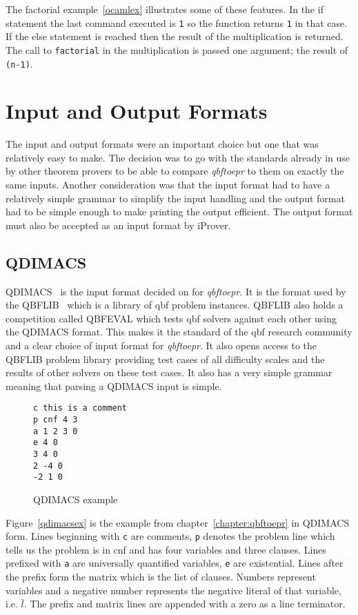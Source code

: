 The factorial example~\ref{ocamlex} illustrates some of these features. In the if statement the last command executed is \texttt{1} so the function returns \texttt{1} in that case. If the else statement is reached then the result of the multiplication is returned. The call to \texttt{factorial} in the multiplication is passed one argument; the result of \texttt{(n-1)}.

\section{Input and Output Formats}
The input and output formats were an important choice but one that was relatively easy to make. The decision was to go with the standards already in use by other theorem provers to be able to compare \textit{qbftoepr} to them on exactly the same inputs. Another consideration was that the input format had to have a relatively simple grammar to simplify the input handling and the output format had to be simple enough to make printing the output efficient. The output format must also be accepted as an input format by iProver.

\subsection{QDIMACS}
QDIMACS~\cite{qdimacs} is the input format decided on for \textit{qbftoepr}. It is the format used by the QBFLIB~\cite{qbflib} which is a library of \gls{qbf} problem instances. QBFLIB also holds a competition called QBFEVAL which tests \gls{qbf} solvers against each other using the QDIMACS format. This makes it the standard of the \gls{qbf} research community and a clear choice of input format for \textit{qbftoepr}. It also opens access to the QBFLIB problem library providing test cases of all difficulty scales and the results of other solvers on these test cases. It also has a very simple grammar meaning that parsing a QDIMACS input is simple.

\begin{figure}
\caption{QDIMACS example}
\begin{CenteredBox}
\begin{lstlisting}[label=qdimacsex]
c this is a comment
p cnf 4 3
a 1 2 3 0
e 4 0
3 4 0
2 -4 0
-2 1 0
\end{lstlisting}
\end{CenteredBox}
\end{figure}
Figure~\ref{qdimacsex} is the example from chapter~\ref{chapter:qbftoepr} in QDIMACS form. Lines beginning with \texttt{c} are comments, \texttt{p} denotes the problem line which tells us the problem is in \gls{cnf} and has four variables and three clauses. Lines prefixed with \texttt{a} are universally quantified variables, \texttt{e} are existential. Lines after the prefix form the matrix which is the list of clauses. Numbers represent variables and a negative number represents the negative literal of that variable, i.e. $\bar{l}$. The prefix and matrix lines are appended with a zero as a line terminator.

